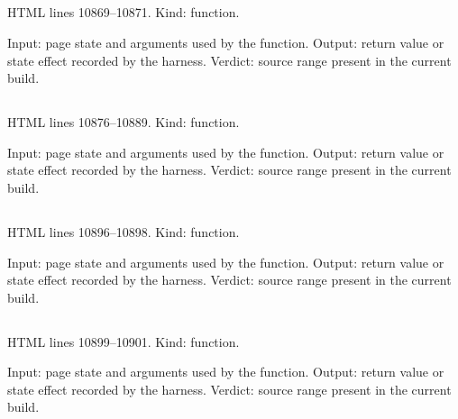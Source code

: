 \subsection*{\texttt{}}
\label{vf_583_runIsInstrumentAnalysed}
HTML lines 10869--10871. Kind: function.

Input: page state and arguments used by the function.
Output: return value or state effect recorded by the harness.
Verdict: source range present in the current build.

\subsection*{\texttt{}}
\label{vf_584_sopProcessingApplicability}
HTML lines 10876--10889. Kind: function.

Input: page state and arguments used by the function.
Output: return value or state effect recorded by the harness.
Verdict: source range present in the current build.

\subsection*{\texttt{}}
\label{vf_585_rdmlStem}
HTML lines 10896--10898. Kind: function.

Input: page state and arguments used by the function.
Output: return value or state effect recorded by the harness.
Verdict: source range present in the current build.

\subsection*{\texttt{}}
\label{vf_586_rdmlKeyOf}
HTML lines 10899--10901. Kind: function.

Input: page state and arguments used by the function.
Output: return value or state effect recorded by the harness.
Verdict: source range present in the current build.

